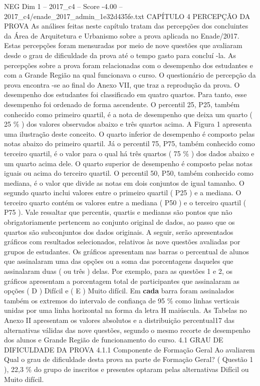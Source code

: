 \begin{textsample}{NEG Dim 1 – 2017\_c4 – Score -4.00 – 2017\_c4/enade\_2017\_admin\_1e32d435fe.txt}  \label{ex:f1_neg_165}
CAPÍTULO 4 PERCEPÇÃO DA PROVA As análises feitas neste capítulo tratam das percepções dos concluintes da Área de Arquitetura e Urbanismo sobre a prova aplicada no Enade/2017.
Estas percepções foram mensuradas por meio de nove questões que avaliaram desde o grau de dificuldade da prova até o tempo gasto para concluí -la.
As percepções sobre a prova foram relacionadas com o desempenho dos estudantes e com a Grande Região na qual funcionava o curso.
O questionário de percepção da prova encontra -se ao final do Anexo VII, que traz a reprodução da prova.
O desempenho dos estudantes foi classificado em quatro quartos.
Para tanto, esse desempenho foi ordenado de forma ascendente.
O percentil 25, P25, também conhecido como primeiro quartil, é a nota de desempenho que deixa um quarto ( 25 \% ) dos valores observados abaixo e três quartos acima.
A Figura 1 apresenta uma ilustração deste conceito.
O quarto inferior de desempenho é composto pelas notas abaixo do primeiro quartil.
Já o percentil 75, P75, também conhecido como terceiro quartil, é o valor para o qual há três quartos ( 75 \% ) dos dados abaixo e um quarto acima dele.
O quarto superior de desempenho é composto pelas notas iguais ou acima do terceiro quartil.
O percentil 50, P50, também conhecido como mediana, é o valor que divide as notas em dois conjuntos de igual tamanho.
O segundo quarto inclui valores entre o primeiro quartil ( P25 ) e a mediana.
O terceiro quarto contém os valores entre a mediana ( P50 ) e o terceiro quartil ( P75 ).
Vale ressaltar que percentis, quartis e medianas são pontos que não obrigatoriamente pertencem ao conjunto original de dados, ao passo que os quartos são subconjuntos dos dados originais.
A seguir, serão apresentados gráficos com resultados selecionados, relativos às nove questões avaliadas por grupos de estudantes.
Os gráficos apresentam nas barras o percentual de alunos que assinalaram uma das opções ou a soma das porcentagens daqueles que assinalaram duas ( ou três ) delas.
Por exemplo, para as questões 1 e 2, os gráficos apresentam a porcentagem total de participantes que assinalaram as opções ( D ) Difícil e ( E ) Muito difícil.
Em \textbf{cada} barra foram assinalados também os extremos do intervalo de confiança de 95 \% como linhas verticais unidas por uma linha horizontal na forma da letra H maiúscula.
As Tabelas no Anexo II apresentam os valores absolutos e a distribuição percentual17 das alternativas válidas das nove questões, segundo o mesmo recorte de desempenho dos alunos e Grande Região de funcionamento do curso. 4.1 GRAU DE DIFICULDADE DA PROVA 4.1.1 Componente de Formação Geral Ao avaliarem Qual o grau de dificuldade desta prova na parte de Formação Geral? ( Questão 1 ), 22,3 \% do grupo de inscritos e presentes optaram pelas alternativas Difícil ou Muito difícil.

\end{textsample}
